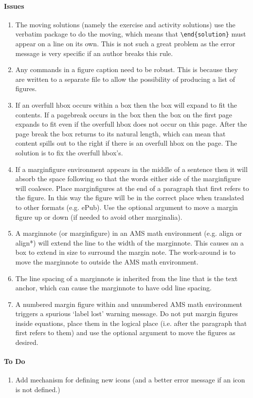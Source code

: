 \documentclass[solutionsatend,twocolumnsolutions]{ouunit}
\begin{document}
\paragraph{Issues}
\begin{enumerate}
\item
The moving solutions (namely the exercise and activity solutions) use the verbatim package to do the moving, which means that \verb”\end{solution}” must appear on a line on its own. This is not such a great problem as the error message is very specific if an author breaks this rule.
\item
Any commands in a figure caption need to be robust. This is because they are written to a separate file to allow the possibility of producing a list of figures.
\item
If an overfull hbox occurs within a box then the box will expand to fit the contents. If a pagebreak occurs in the box then the box on the first page expands to fit even if the overfull hbox does not occur on this page. After the page break the box returns to its natural length, which can mean that content spills out to the right if there is an overfull hbox on the page. The solution is to fix the overfull hbox's.
\item
If a marginfigure environment appears in the middle of a sentence then it will absorb the space following so that the words either side of the marginfigure will coalesce. Place marginfigures at the end of a paragraph that first refers to the figure. In this way the figure will be in the correct place when translated to other formats (e.g. ePub). Use the optional argument to move a margin figure up or down (if needed to avoid other marginalia).
\item
A marginnote (or marginfigure) in an AMS math environment (e.g. align or align*) will extend the line to the width of the marginnote. This causes an a box to extend in size to surround the margin note. The work-around is to move the marginnote to outside the AMS math environment.
\item
The line spacing of a marginnote is inherited from the line that is the text anchor, which can cause the marginnote to have odd line spacing.
\item
A numbered margin figure within and unnumbered AMS math environment triggers a spurious `label lost' warning message. Do not put margin figures inside equations, place them in the logical place (i.e. after the paragraph that first refers to them) and use the optional argument to move the figures as desired.
\end{enumerate}

\paragraph{To Do}
\begin{enumerate}
\item
Add mechanism for defining new icons (and a better error message if an icon is not defined.)
\end{enumerate}
\printexercisesolutions
\printactivitysolutions
\printindex
\end{document}
